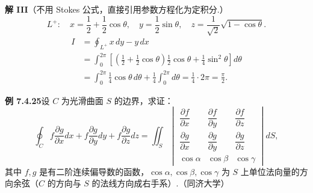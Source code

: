 \documentclass[UTF8, 12pt, fontset=fandol, oneside]{ctexart}
\begin{document}
\noindent\textbf{解 III}\quad （不用 Stokes 公式，直接引用参数方程化为定积分.）
\[
L^+:\quad x=\frac12+\frac12\cos\theta,\quad y=\frac12\sin\theta,\quad
z=\frac1{\sqrt2}\sqrt{1-\cos\theta}.
\]
\[
\begin{aligned}
I&=\oint_{L^+}x\,dy-y\,dx\\
&=\int_0^{2\pi}\left[\left(\frac12+\frac12\cos\theta\right)\frac12\cos\theta+\frac14\sin^2\theta\right]d\theta\\
&=\int_0^{2\pi}\frac14\cos\theta\,d\theta+\frac14\int_0^{2\pi}d\theta
=\frac14\cdot2\pi=\frac\pi2.
\end{aligned}
\]

\noindent\textbf{例 7.4.25}\quad 设 $C$ 为光滑曲面 $S$ 的边界，求证：
\[
\oint_C f\frac{\partial g}{\partial x}dx+f\frac{\partial g}{\partial y}dy+f\frac{\partial g}{\partial z}dz
=\iint_S
\begin{vmatrix}
\dfrac{\partial f}{\partial x} & \dfrac{\partial f}{\partial y} & \dfrac{\partial f}{\partial z}\\
\dfrac{\partial g}{\partial x} & \dfrac{\partial g}{\partial y} & \dfrac{\partial g}{\partial z}\\
\cos\alpha & \cos\beta & \cos\gamma
\end{vmatrix}dS,
\]
其中 $f,g$ 是有二阶连续偏导数的函数，$\cos\alpha,\cos\beta,\cos\gamma$ 为 $S$ 上单位法向量的方向余弦（$C$ 的方向与 $S$ 的法线方向成右手系）.（同济大学）
\end{document}
